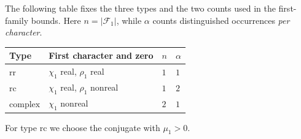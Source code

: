 \documentclass[11pt]{amsart}
\numberwithin{equation}{section}
\theoremstyle{plain}
\theoremstyle{definition}
\theoremstyle{remark}
\newcommand{\1}{\mathbf{1}}
\begin{document}
The following table fixes the three types and the two counts used in the first-family
bounds. Here $n=|\mathcal F_1|$, while $\alpha$ counts distinguished occurrences
\emph{per character}.
\begin{center}
\begin{tabular}{@{}llll@{}}
\toprule
Type & First character and zero & $n$ & $\alpha$\\
\midrule
$\mathrm{rr}$ & $\chi_1$ real, $\rho_1$ real & $1$ & $1$\\
$\mathrm{rc}$ & $\chi_1$ real, $\rho_1$ nonreal & $1$ & $2$\\
$\mathrm{complex}$ & $\chi_1$ nonreal & $2$ & $1$\\
\bottomrule
\end{tabular}
\end{center}
For type $\mathrm{rc}$ we choose the conjugate with $\mu_1>0$.
\end{document}
